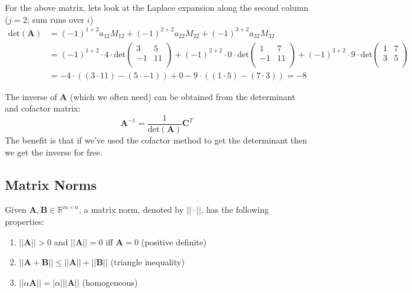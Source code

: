 \documentclass[12pt]{article}
\newcommand{\ve}[1]{\ensuremath{\mathbf{#1}}}
\begin{document}
For the above matrix, lets look at the Laplace expansion along the second column ($j = 2$; sum runs over $i$)
\begin{align}
\text{det}(\ve{A}) &= (-1)^{1+2} a_{12} M_{12} + (-1)^{2+2} a_{22} M_{22} + (-1)^{3+2} a_{32} M_{32} \nonumber \\
%
&= (-1)^{1+2} \cdot 4 \cdot \text{det}\begin{pmatrix}
        3 & 5 \\
        -1 & 11 \\ \end{pmatrix} + (-1)^{2+2} \cdot 0 \cdot \text{det}\begin{pmatrix} 
        1 & 7 \\
        -1 & 11 \\ \end{pmatrix} + (-1)^{3+2} \cdot 9 \cdot \text{det}\begin{pmatrix} 
        1 & 7 \\
        3 & 5 \\\end{pmatrix} \nonumber \\
%
&= -4 \cdot ((3 \cdot 11) - (5 \cdot -1)) + 0 -9 \cdot ((1 \cdot 5) - (7 \cdot 3)) = -8 \nonumber
\end{align}

The inverse of $\ve{A}$ (which we often need) can be obtained from the determinant and cofactor matrix:
%
\begin{equation}
\ve{A}^{-1} = \frac{1}{\text{det}(\ve{A})}\ve{C}^T \nonumber
\end{equation}
%
The benefit is that if we've used the cofactor method to get the determinant then we get the inverse for free. 

\subsection{Matrix Norms}
Given $\ve{A}, \ve{B} \in \mathbb{R}^{m \times n}$, a matrix norm, denoted by $|| \cdot ||$, has the following properties:
%
\begin{enumerate}
\item $||\ve{A}|| > 0$ and $||\ve{A}|| = 0$ iff $\ve{A} = 0$ (positive definite)
\item $||\ve{A} + \ve{B}|| \leq ||\ve{A}|| + ||\ve{B}||$ (triangle inequality)
\item $||\alpha \ve{A}|| = |\alpha| ||\ve{A}||$ (homogeneous)
\end{enumerate}
\end{document}
